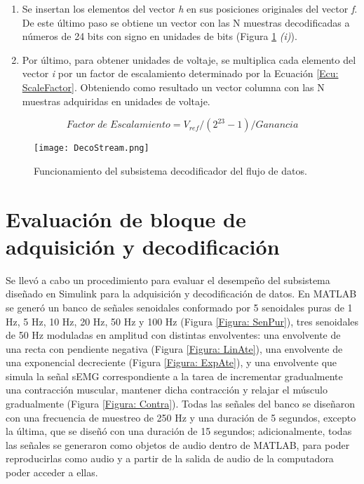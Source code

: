\begin{enumerate}
	\item Se insertan los elementos del vector \emph{h} en sus posiciones originales del vector \emph{f}. De este último paso se obtiene un vector con las N muestras decodificadas a números de 24 bits con signo en unidades de bits (Figura \ref{Figura: DecoStream} \emph{(i)}).
	
	\item Por último, para  obtener unidades de voltaje, se multiplica cada elemento del vector \emph{i} por un factor de escalamiento determinado por la Ecuación \ref{Ecu: ScaleFactor}. Obteniendo como resultado un vector columna con las N muestras adquiridas en unidades de voltaje.
\end{enumerate}

\vfill
\begin{equation}
	Factor\; de\; Escalamiento = V_{ref}/(2^{23}-1)/Ganancia
	\label{Ecu: ScaleFactor}
\end{equation}
\vfill
\begin{figure}[htbb]
\centering
	\texttt{[image: DecoStream.png]}
	\caption{Funcionamiento del subsistema decodificador del flujo de datos.}
	\label{Figura: DecoStream}
\end{figure}
\vfill

\newpage
\section{Evaluación de bloque de adquisición y decodificación}\label{Sec: EvalAdquisicion}
Se llevó a cabo un procedimiento para evaluar el desempeño del subsistema diseñado en Simulink\textregistered \; para la adquisición y decodificación de datos. En MATLAB\textregistered \; se generó un banco de señales senoidales conformado por 5 senoidales puras de 1 Hz, 5 Hz, 10 Hz, 20 Hz, 50 Hz y 100 Hz (Figura \ref{Figura: SenPur}), tres senoidales de 50 Hz moduladas en amplitud con distintas envolventes: 
una envolvente de una recta con pendiente negativa (Figura \ref{Figura: LinAte}), una envolvente de una exponencial decreciente (Figura \ref{Figura: ExpAte}), y una envolvente que simula la señal sEMG correspondiente a la tarea de incrementar gradualmente una contracción muscular, mantener dicha contracción y relajar el músculo gradualmente (Figura \ref{Figura: Contra}). Todas las señales del banco se diseñaron con una frecuencia de muestreo de 250 Hz y una duración de 5 segundos, excepto la última, que se diseñó con una duración de 15 segundos; adicionalmente, todas las señales se generaron como objetos de audio dentro de MATLAB\textregistered, para poder reproducirlas como audio y a partir de la salida de audio de la computadora poder acceder a ellas.

